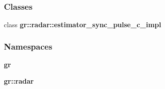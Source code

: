 \subsubsection*{Classes}
\begin{DoxyCompactItemize}
\item 
class {\bf gr\+::radar\+::estimator\+\_\+sync\+\_\+pulse\+\_\+c\+\_\+impl}
\end{DoxyCompactItemize}
\subsubsection*{Namespaces}
\begin{DoxyCompactItemize}
\item 
 {\bf gr}
\item 
 {\bf gr\+::radar}
\end{DoxyCompactItemize}
